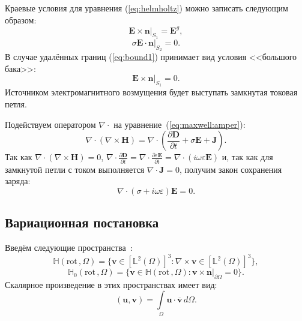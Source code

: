 \documentclass[a4paper,14pt]{article}
\begin{document}
Краевые условия для уравнения (\ref{eq:helmholtz}) можно записать следующим образом:
\begin{equation}
	\left. \mathbf{E} \times \mathbf{n} \right | _{ S_1 } = {\mathbf{E}} ^g , \label{eq:bound1}
\end{equation}
\begin{equation}
	\left. \sigma \mathbf{E} \cdot \mathbf{n} \right | _{ S_2 } = 0 . \label{eq:bound2}
\end{equation}
В случае удалённых границ (\ref{eq:bound1}) принимает вид условия <<большого бака>>:
\begin{equation}
	\left. \mathbf{E} \times \mathbf{n} \right | _{ S_1 } = 0 . \label{eq:bound1_zero}
\end{equation}
Источником электромагнитного возмущения будет выступать замкнутая токовая петля.

Подействуем оператором $\nabla \cdot$ на уравнение~(\ref{eq:maxwell:amper}):
\begin{equation*}
	\nabla \cdot ( \nabla \times \mathbf{H} ) = \nabla \cdot ( \frac{\partial \mathbf{D}}{\partial t} + \sigma \mathbf{E} + \mathbf{J} ) .
\end{equation*}
Так как $\nabla \cdot ( \nabla \times \mathbf{H} ) = 0$, $\nabla \cdot \frac{\partial \mathbf{D}}{\partial t} = \nabla \cdot \frac{\partial \varepsilon \mathbf{E}}{\partial t} = \nabla \cdot (i \omega \varepsilon \mathbf{E})$ и, так как для замкнутой петли с током выполняется $\nabla \cdot \mathbf{J} = 0$, получим закон сохранения заряда:
\begin{equation}
	\nabla \cdot ( \sigma + i \omega \varepsilon ) \mathbf{E} = 0 . \label{eq:charge}
\end{equation}


\subsection{Вариационная постановка}
Введём следующие пространства~\citep{balandin_vfem,monk}:
\begin{equation*}
	\mathbb{H} ( \mathrm{rot}\,, \Omega ) = \lbrace \mathbf{v} \in [\mathbb{L}^{2}(\Omega)]^{3} : \nabla \times \mathbf{v} \in [\mathbb{L}^{2}(\Omega)]^{3} \rbrace , \label{eq:H_rot}
\end{equation*}
\begin{equation*}
	\mathbb{H}_{0}( \mathrm{rot}\,, \Omega ) = \lbrace \mathbf{v} \in \mathbb{H}(\mathrm{rot}\,, \Omega) : \left. \mathbf{v} \times \mathbf{n} \right|_{\partial \Omega} = 0  \rbrace . \label{eq:H0_rot}
\end{equation*}
Скалярное произведение в этих пространствах имеет вид:
\begin{equation*}
	( \mathbf{u}, \mathbf{v} ) = \int\limits_{\Omega} \mathbf{u} \cdot \overline{\mathbf{v}} \,d\Omega .
\end{equation*}
\end{document}

